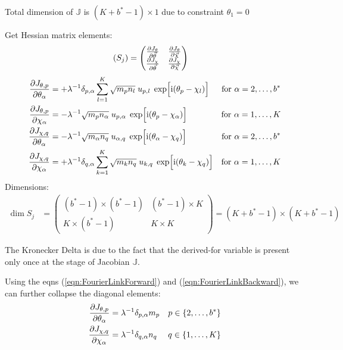 \documentclass[
	english,
	a4paper,
	fontsize=10pt,
	parskip=half,
	titlepage=true,
	DIV=12,
	final
]{scrreprt}
\newcommand*{\iunit}{\ensuremath{\mathrm{i}}}
\begin{document}
Total dimension of $\mathbb{J}$ is $(K + b^* - 1) \times 1$ due to constraint $\theta_1 = 0$

Get Hessian matrix elements:
\begin{align}
	\qty( S_j )
&=
	\begin{pmatrix}
		\pdv{J_{\theta}}{\vec{\theta}} &
		\pdv{J_{\theta}}{\vec{\chi  }} 
		\\
		\pdv{J_{\chi  }}{\vec{\theta}} &
		\pdv{J_{\chi  }}{\vec{\chi  }} 
	\end{pmatrix}
\end{align}
\begin{align}
	\pdv{J_{\theta, p}}{\theta_{\alpha}}
&=
	+
	\lambda^{-1}
	\delta_{p,\alpha}
	\sum_{l=1}^{K}
		\sqrt{m_p n_l} \; u_{p,l} \; \exp[\Big. \iunit(\theta_p - \chi_l)]
&\text{for } \alpha = 2, \ldots, b^*
\\
	\pdv{J_{\theta, p}}{\chi_{\alpha}}
&=
	-
	\lambda^{-1}
	\sqrt{m_p n_\alpha} \; u_{p,\alpha} \; \exp[\Big. \iunit(\theta_p - \chi_\alpha)]
&\text{for } \alpha = 1, \ldots, K
\\
	\pdv{J_{\chi, q}}{\theta_{\alpha}}
&=
	-
	\lambda^{-1}
	\sqrt{m_\alpha n_q} \; u_{\alpha,q} \; \exp[\Big. \iunit(\theta_\alpha - \chi_q)]
&\text{for } \alpha = 2, \ldots, b^*
\\
	\pdv{J_{\chi, q}}{\chi_{\alpha}}
&=
	+
	\lambda^{-1}
	\delta_{q,\alpha}
	\sum_{k=1}^{K}
		\sqrt{m_k n_q} \; u_{k,q} \; \exp[\Big. \iunit(\theta_k - \chi_q)]
&\text{for } \alpha = 1, \ldots, K
\end{align}
Dimensions:
\begin{align}
	\dim S_j
&=
	\begin{pmatrix}
		(b^* - 1) \times (b^* - 1)	& (b^* - 1) \times K \\
		K \times (b^* - 1)			& K \times K
	\end{pmatrix}
=
	(K + b^* - 1) \times (K + b^* - 1)
\end{align}

The Kronecker Delta is due to the fact that the derived-for variable is present only once at the stage of Jacobian $\mathbb{J}$.

Using the eqns (\ref{eqn:FourierLinkForward}) and (\ref{eqn:FourierLinkBackward}), we can further collapse the diagonal elements:
\begin{align}
	\pdv{J_{\theta, p}}{\theta_{\alpha}}
&=
	\lambda^{-1}
	\delta_{p,\alpha}
	m_p
&
	p \in \{2, \ldots, b^*\}
\\
	\pdv{J_{\chi, q}}{\chi_{\alpha}}
&=
	\lambda^{-1}
	\delta_{q,\alpha}
	n_q
&
	q \in \{1, \ldots, K\}
\end{align}
\end{document}
